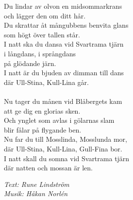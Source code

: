 \vspace{10pt}
Du lindar av olvon en midsommarkrans\\
och lägger den om ditt hår.\\
Du skrattar åt mångubbens benvita glans\\
som högt över tallen står.\\
I natt ska du dansa vid Svartrama tjärn\\
i långdans, i språngdans\\
på glödande järn.\\
I natt är du bjuden av dimman till dans\\
där Ull-Stina, Kull-Lina går.\\
\\
Nu tager du månen vid Blåbergets kam\\
att ge dig en glorias sken.\\
Och ynglet som avlas i gölarnas slam\\
blir fålar på flygande ben.\\
Nu far du till Mosslinda, Mosslunda mor,\\
där Ull-Stina, Kull-Lina, Gull-Fina bor.\\
I natt skall du somna vid Svartrama tjärn\\
där natten och mossan är len.
\par
\vspace{10pt}
{\footnotesize\textit{Text: Rune Lindström\\ Musik: Håkan Norlén}}
